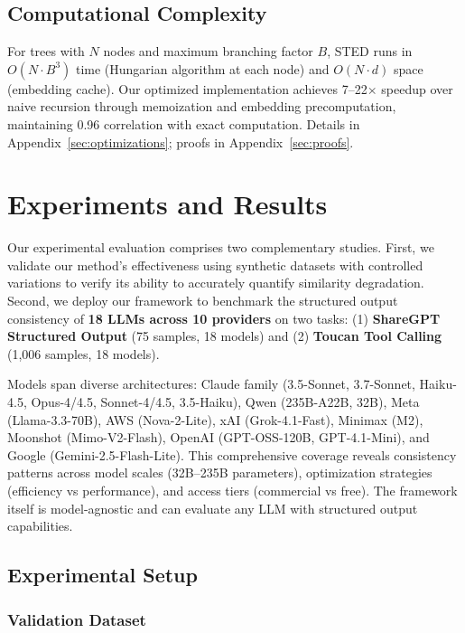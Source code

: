 \documentclass{article}
\theoremstyle{plain}
\theoremstyle{definition}
\begin{document}
\subsection{Computational Complexity}

For trees with $N$ nodes and maximum branching factor $B$, STED runs in $O(N \cdot B^3)$ time (Hungarian algorithm at each node) and $O(N \cdot d)$ space (embedding cache). Our optimized implementation achieves 7--22$\times$ speedup over naive recursion through memoization and embedding precomputation, maintaining 0.96 correlation with exact computation. Details in Appendix~\ref{sec:optimizations}; proofs in Appendix~\ref{sec:proofs}.

\section{Experiments and Results}

Our experimental evaluation comprises two complementary studies. First, we validate our method's effectiveness using synthetic datasets with controlled variations to verify its ability to accurately quantify similarity degradation. Second, we deploy our framework to benchmark the structured output consistency of \textbf{18 LLMs across 10 providers} on two tasks: (1) \textbf{ShareGPT Structured Output} (75 samples, 18 models) and (2) \textbf{Toucan Tool Calling} (1,006 samples, 18 models).

Models span diverse architectures: Claude family (3.5-Sonnet, 3.7-Sonnet, Haiku-4.5, Opus-4/4.5, Sonnet-4/4.5, 3.5-Haiku), Qwen (235B-A22B, 32B), Meta (Llama-3.3-70B), AWS (Nova-2-Lite), xAI (Grok-4.1-Fast), Minimax (M2), Moonshot (Mimo-V2-Flash), OpenAI (GPT-OSS-120B, GPT-4.1-Mini), and Google (Gemini-2.5-Flash-Lite). This comprehensive coverage reveals consistency patterns across model scales (32B--235B parameters), optimization strategies (efficiency vs performance), and access tiers (commercial vs free). The framework itself is model-agnostic and can evaluate any LLM with structured output capabilities.

\subsection{Experimental Setup}

\subsubsection{Validation Dataset}
\end{document}
